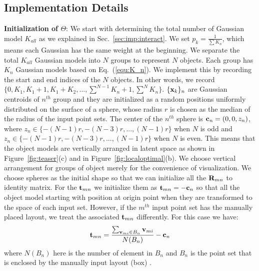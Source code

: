 \subsection{Implementation Details}
%
\textbf{Initialization of $\Theta$}: We start with determining the total number of Gaussian model $K_{all}$ as we explained in Sec.~\ref{sec:imp:interact}.
We set $p_k=\frac{1}{\sum K_n}$, which means each Gaussian has the same weight at the beginning. 
%
We separate the total $K_{all}$ Gaussian models into $N$ groups to represent $N$ objects. 
%
Each group has $K_n$ Gaussian models based on Eq.~(\ref{equ:K_n}). 
We implement this by recording the start and end indices of the $N$ objects. In other words, we record
$\{0,K_1,K_1+1,K_1+K_2,...,\sum^{N-1}K_n+1,\sum^N K_n\}$. $\{\mathbf{x}_k\}_n$ are Gaussian centroids of $n^{th}$ group and they are initialized as a random positions uniformly distributed on the surface of a sphere, whose radius $r$ is chosen as the median of the radius of the input point sets. 
%
The center of the $n^{th}$ sphere is $\mathbf{c}_n=(0,0,z_n)$, where $z_n\in \{-(N-1)r,-(N-3)r,...,(N-1)r\}$ when $N$ is odd and $z_n\in \{-(N-1)r,-(N-3)r,...,(N-1)r\}$ when $N$ is even. 
%
This means that the object models are vertically arranged in latent space as shown in Figure~\ref{fig:teaser}(c) and in Figure~\ref{fig:localoptimal}(b). 
We choose vertical arrangement for groups of object merely for the convenience of visualization. 
%
We choose spheres as the initial shape so that we can initialize all the $\mathbf{R}_{mn}$ to identity matrix. 
%
For the $\mathbf{t}_{mn}$ we initialize them as $\mathbf{t}_{mn}=- \mathbf{c}_n$ so that all the object model starting with position at origin point when they are transformed to the space of each input set. 
%
However, if the $m^{th}$ input point set has the manually placed layout, we treat the associated $\mathbf{t}_{mn}$ differently. For this case we have:
\begin{equation}
	\label{equ:initt}
	\mathbf{t}_{mn}=\frac{\sum_{\mathbf{v}_{mi} \in B_n}\mathbf{v}_{mi}}{N(B_n)}-\mathbf{c}_n
\end{equation}
where $N(B_n)$ here is the number of element in $B_n$ and $B_n$ is the point set that is enclosed by the manually input layout (box) . 
 
